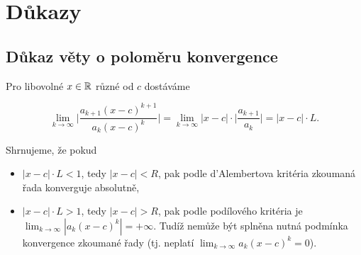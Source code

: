 \section{Důkazy}

\subsection*{Důkaz věty o poloměru konvergence}

Pro libovolné $x\in\mathbb{R}$ různé od $c$ dostáváme

\[ \lim_{k\to\infty} \bigg| \frac{a_{k+1} (x-c)^{k+1}}{a_k (x-c)^k} \bigg| = \lim_{k\to\infty} |x - c| \cdot \bigg| \frac{a_{k+1}}{a_k} \bigg| = |x - c| \cdot L. \]

\noindent Shrnujeme, že pokud
\begin{itemize}
    \item $|x - c| \cdot L < 1$, tedy $|x - c| < R$, pak podle d'Alembertova kritéria zkoumaná řada konverguje absolutně,
    \item $|x - c| \cdot L > 1$, tedy $|x - c| > R$, pak podle podílového kritéria je $\displaystyle\lim_{k\to\infty} |a_k (x-c)^k| = +\infty$. Tudíž nemůže být splněna nutná podmínka konvergence zkoumané řady (tj. neplatí $\displaystyle\lim_{k\to\infty} a_k (x-c)^k = 0$).
\end{itemize}

\pagebreak
